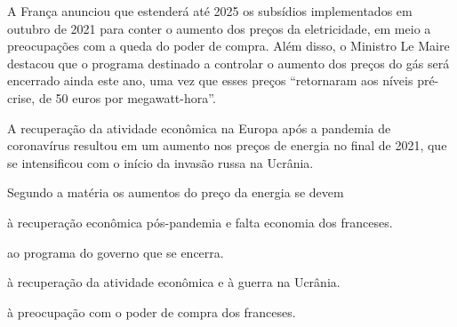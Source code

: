 \begin{myquote}






A França anunciou que estenderá até 2025 os subsídios implementados em outubro
de 2021 para conter o aumento dos preços da eletricidade, em meio a
preocupações com a queda do poder de compra. Além disso, o Ministro Le Maire
destacou que o programa destinado a controlar o aumento dos preços do gás será
encerrado ainda este ano, uma vez que esses preços ``retornaram aos níveis
pré-crise, de 50 euros por megawatt-hora''.

A recuperação da atividade econômica na Europa após a pandemia de coronavírus
resultou em um aumento nos preços de energia no final de 2021, que se
intensificou com o início da invasão russa na Ucrânia.


\end{myquote}

Segundo a matéria os aumentos do preço da energia se devem

\begin{escolha}
    
    \item à recuperação econômica pós-pandemia e falta economia dos franceses.
    
    \item ao programa do governo que se encerra.
    
    \item à recuperação da atividade econômica e à guerra na Ucrânia.
    
    \item à preocupação com o poder de compra dos franceses.

\end{escolha}

